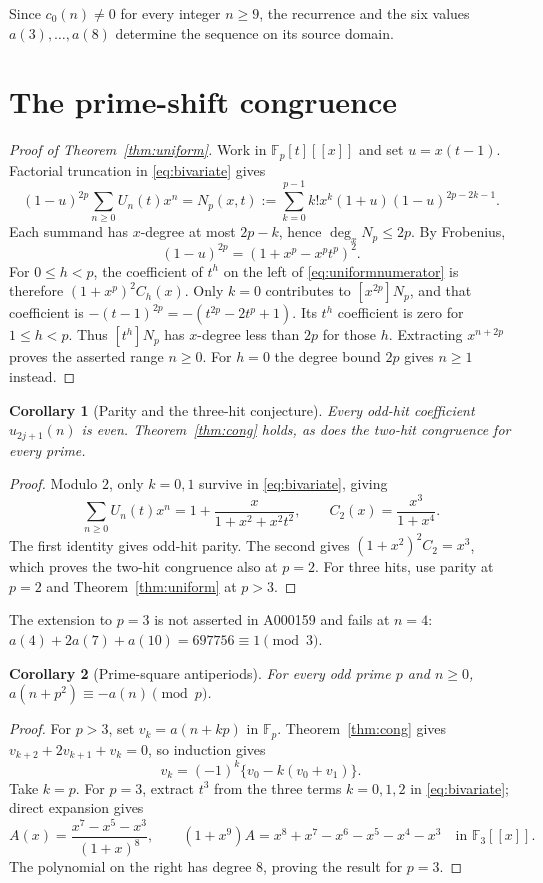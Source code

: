 \documentclass[11pt]{article}
\newtheorem{corollary}{Corollary}
\begin{document}
Since $c_0(n)\ne0$ for every integer $n\geq9$, the recurrence and the
six values $a(3),\ldots,a(8)$ determine the sequence on its source domain.

\section{The prime-shift congruence}
\begin{proof}[Proof of Theorem~\ref{thm:uniform}]
Work in $\mathbb F_p[t][[x]]$ and set $u=x(t-1)$.
Factorial truncation in \eqref{eq:bivariate} gives
\begin{equation}\label{eq:uniformnumerator}
 (1-u)^{2p}\sum_{n\geq0}U_n(t)x^n
 =N_p(x,t):=\sum_{k=0}^{p-1}k!x^k(1+u)(1-u)^{2p-2k-1}.
\end{equation}
Each summand has $x$-degree at most $2p-k$, hence $\deg_xN_p\leq2p$.
By Frobenius,
\[
 (1-u)^{2p}=(1+x^p-x^pt^p)^2.
\]
For $0\leq h<p$, the coefficient of $t^h$ on the left of
\eqref{eq:uniformnumerator} is therefore $(1+x^p)^2C_h(x)$.
Only $k=0$ contributes to $[x^{2p}]N_p$, and that coefficient is
$-(t-1)^{2p}=-(t^{2p}-2t^p+1)$.
Its $t^h$ coefficient is zero for $1\leq h<p$.
Thus $[t^h]N_p$ has $x$-degree less than $2p$ for those $h$.
Extracting $x^{n+2p}$ proves the asserted range $n\geq0$.
For $h=0$ the degree bound $2p$ gives $n\geq1$ instead.
\end{proof}

\begin{corollary}[Parity and the three-hit conjecture]\label{cor:parity}
Every odd-hit coefficient $u_{2j+1}(n)$ is even.
Theorem~\ref{thm:cong} holds, as does the two-hit congruence for every prime.
\end{corollary}
\begin{proof}
Modulo $2$, only $k=0,1$ survive in \eqref{eq:bivariate}, giving
\[
 \sum_{n\geq0}U_n(t)x^n
 =1+\frac{x}{1+x^2+x^2t^2},\qquad
 C_2(x)=\frac{x^3}{1+x^4}.
\]
The first identity gives odd-hit parity. The second gives
$(1+x^2)^2C_2=x^3$, which proves the two-hit congruence also at $p=2$.
For three hits, use parity at $p=2$ and Theorem~\ref{thm:uniform} at $p>3$.
\end{proof}

The extension to $p=3$ is not asserted in A000159 and fails at $n=4$:
$a(4)+2a(7)+a(10)=697756\equiv1\pmod3$.

\begin{corollary}[Prime-square antiperiods]\label{cor:antiperiod}
For every odd prime $p$ and $n\geq0$,
$a(n+p^2)\equiv-a(n)\pmod p$.
\end{corollary}
\begin{proof}
For $p>3$, set $v_k=a(n+kp)$ in $\mathbb F_p$.
Theorem~\ref{thm:cong} gives $v_{k+2}+2v_{k+1}+v_k=0$, so induction gives
\[
 v_k=(-1)^k\{v_0-k(v_0+v_1)\}.
\]
Take $k=p$. For $p=3$, extract $t^3$ from the three terms $k=0,1,2$
in \eqref{eq:bivariate}; direct expansion gives
\[
 A(x)=\frac{x^7-x^5-x^3}{(1+x)^8},\qquad
 (1+x^9)A=x^8+x^7-x^6-x^5-x^4-x^3
 \quad\text{in }\mathbb F_3[[x]].
\]
The polynomial on the right has degree $8$, proving the result for $p=3$.
\end{proof}
\end{document}

